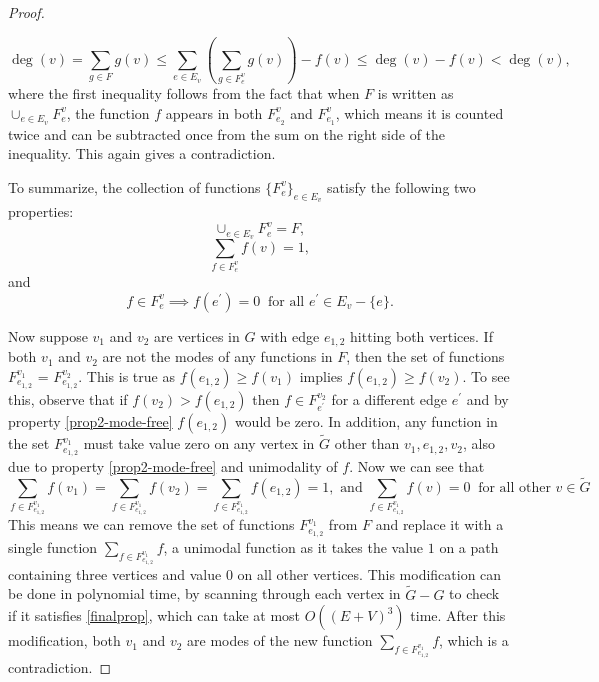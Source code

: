 \documentclass[10pt,a4paper]{amsart}
\begin{document}
\begin{proof}
\begin{itemize}
	\[
		\deg(v) = \sum_{g \in F} g(v) \leq \sum_{e \in E_v} \left( \sum_{g \in F^{v}_{e}} g(v) \right)  - f(v) \leq \deg(v) - f(v) < \deg(v),
	\]
	where the first inequality follows from the fact that when $F$ is written as $\cup_{e \in E_v} F^{v}_{e}$, the function $f$ appears in both $F^v_{e_2}$ and $F^v_{e_1}$, which means it is counted twice and can be subtracted once from the sum on the right side of the inequality. This again gives a contradiction.
\end{itemize}
To summarize, the collection of functions $\{ F^{v}_{e} \}_{e \in E_v}$ satisfy the following two properties:
\begin{equation}
\label{prop1-mode-free}
\cup_{e \in E_v} F^{v}_{e} = F,
\end{equation}
\begin{equation}
\label{prop3-mode-free}
\sum_{f \in F^{v}_{e}} f(v) = 1,
\end{equation}
and
\begin{equation}
\label{prop2-mode-free}
f \in F^{v}_{e} \implies f(e^{'}) = 0 \ \text{ for all $e^{'} \in E_v - \{e\}$}.
\end{equation}

Now suppose $v_1$ and $v_2$ are vertices in $G$ with edge $e_{1,2}$ hitting both vertices. If both $v_1$ and $v_2$ are not the modes of any functions in $F$, then the set of functions $F^{v_1}_{e_{1,2}}$ = $F^{v_2}_{e_{1,2}} $. This is true as $f(e_{1,2}) \geq f(v_1)$ implies $f(e_{1,2}) \geq f(v_2)$. To see this, observe that if $f(v_2) > f(e_{1,2})$ then $f \in F^{v_2}_{e^{'}}$ for a different edge $e^{'}$ and by property \eqref{prop2-mode-free} $f(e_{1,2})$ would be zero. 
In addition, any function in the set $F^{v_1}_{e_{1,2}}$ must take value zero on any vertex in $\tilde{G}$ other than $v_1, e_{1,2}, v_2$, also due to property \eqref{prop2-mode-free} and unimodality of $f$. Now we can see that
\begin{equation}
\label{finalprop}
	\sum_{f \in F^{v_1}_{e_{1,2}}} f(v_1) = \sum_{f \in F^{v_1}_{e_{1,2}}} f(v_2) = \sum_{f \in F^{v_1}_{e_{1,2}}} f(e_{1,2}) = 1, \text{ \ and \ } \sum_{f \in F^{v_1}_{e_{1,2}}} f(v) = 0 \ \text{ for all other $v \in \tilde{G}$} 
\end{equation}
This means we can remove the set of functions $F^{v_1}_{e_{1,2}}$ from $F$ and replace it with a single function $\sum_{f \in F^{v_1}_{e_{1,2}}} f$, a  unimodal function as it takes the value $1$ on a path containing three vertices and value $0$ on all other vertices. This modification can be done in polynomial time, by scanning through each vertex in $\tilde{G}-G$ to check if it satisfies \eqref{finalprop}, which can take at most $O((E + V)^3)$ time. After this modification, both $v_1$ and $v_2$ are modes of the new function $\sum_{f \in F^{v_1}_{e_{1,2}}} f$, which is a contradiction.
\end{proof}
\end{document}
